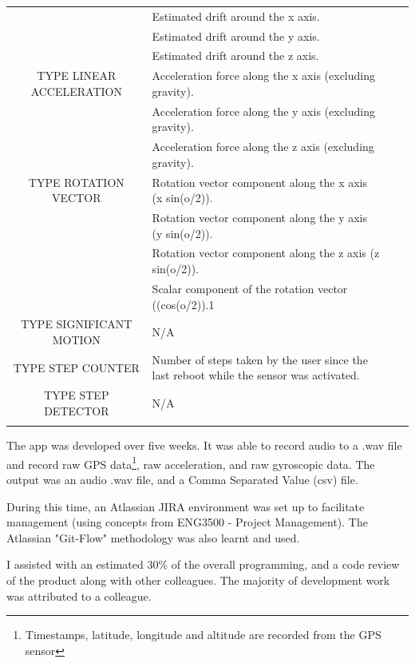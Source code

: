 \documentclass{UoNMCHA}
\numberwithin{equation}{section}
\begin{document}
\begin{table}[h!]
\begin{center}
{\begin{tabular}{c l l l|}
                  & Estimated drift around the x axis. \\
                  & Estimated drift around the y axis. \\
                  & Estimated drift around the z axis. \\
                TYPE LINEAR ACCELERATION & Acceleration force along the x axis (excluding gravity). \\
                  & Acceleration force along the y axis (excluding gravity). \\
                  & Acceleration force along the z axis (excluding gravity). \\
                TYPE ROTATION VECTOR & Rotation vector component along the x axis (x  sin(o/2)). \\
                  & Rotation vector component along the y axis (y  sin(o/2)). \\
                  & Rotation vector component along the z axis (z  sin(o/2)). \\
                  & Scalar component of the rotation vector ((cos(o/2)).1 \\
                TYPE SIGNIFICANT MOTION & N/A \\
                TYPE STEP COUNTER & Number of steps taken by the user since the last reboot while the sensor was activated. \\
                TYPE STEP DETECTOR & N/A \\
                \\ \hline
            \end{tabular}
        }
    \end{center}
\end{table}

The app was developed over five weeks. It was able to record audio to a .wav file and record raw GPS data\footnote{Timestamps, latitude, longitude and altitude are recorded from the GPS sensor}, raw acceleration, and raw gyroscopic data. The output was an audio .wav file, and a Comma Separated Value (csv) file.

During this time, an Atlassian JIRA environment was set up to facilitate management (using concepts from ENG3500 - Project Management). The Atlassian "Git-Flow" methodology was also learnt and used.

I assisted with an estimated 30\% of the overall programming, and a code review of the product along with other colleagues. The majority of development work was attributed to a colleague.
\end{document}
